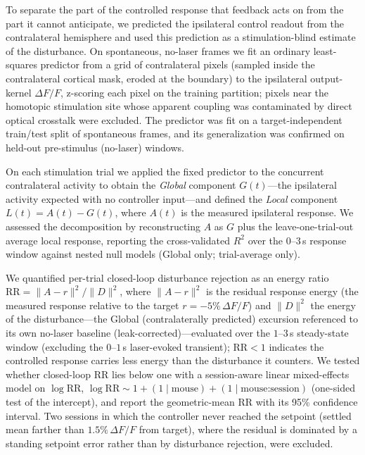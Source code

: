 To separate the part of the controlled response that feedback acts on from the part it cannot anticipate, we predicted the ipsilateral control readout from the contralateral hemisphere and used this prediction as a stimulation-blind estimate of the disturbance. On spontaneous, no-laser frames we fit an ordinary least-squares predictor from a grid of contralateral pixels (sampled inside the contralateral cortical mask, eroded at the boundary) to the ipsilateral output-kernel $\Delta F/F$, z-scoring each pixel on the training partition; pixels near the homotopic stimulation site whose apparent coupling was contaminated by direct optical crosstalk were excluded. The predictor was fit on a target-independent train/test split of spontaneous frames, and its generalization was confirmed on held-out pre-stimulus (no-laser) windows.

On each stimulation trial we applied the fixed predictor to the concurrent contralateral activity to obtain the \emph{Global} component $G(t)$---the ipsilateral activity expected with no controller input---and defined the \emph{Local} component $L(t) = A(t) - G(t)$, where $A(t)$ is the measured ipsilateral response. We assessed the decomposition by reconstructing $A$ as $G$ plus the leave-one-trial-out average local response, reporting the cross-validated $R^2$ over the $0$--$3$\,s response window against nested null models (Global only; trial-average only).

We quantified per-trial closed-loop disturbance rejection as an energy ratio $\mathrm{RR} = \lVert A - r\rVert^2 / \lVert D\rVert^2$, where $\lVert A - r\rVert^2$ is the residual response energy (the measured response relative to the target $r = -5\%\,\Delta F/F$) and $\lVert D\rVert^2$ the energy of the disturbance---the Global (contralaterally predicted) excursion referenced to its own no-laser baseline (leak-corrected)---evaluated over the $1$--$3$\,s steady-state window (excluding the $0$--$1$\,s laser-evoked transient); $\mathrm{RR} < 1$ indicates the controlled response carries less energy than the disturbance it counters. We tested whether closed-loop $\mathrm{RR}$ lies below one with a session-aware linear mixed-effects model on $\log \mathrm{RR}$, $\log\mathrm{RR} \sim 1 + (1 \mid \text{mouse}) + (1 \mid \text{mouse:session})$ (one-sided test of the intercept), and report the geometric-mean $\mathrm{RR}$ with its 95\% confidence interval. Two sessions in which the controller never reached the setpoint (settled mean farther than $1.5\%\,\Delta F/F$ from target), where the residual is dominated by a standing setpoint error rather than by disturbance rejection, were excluded.

